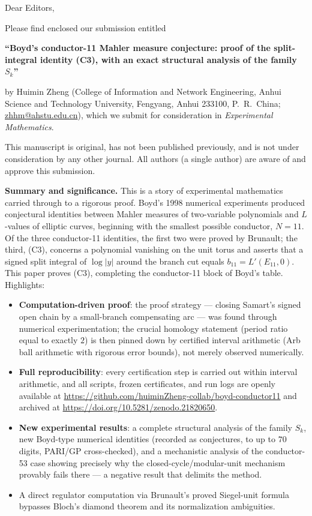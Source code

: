 \documentclass[11pt]{article}
\begin{document}
\thispagestyle{empty}

Dear Editors,

Please find enclosed our submission entitled

\begin{center}
\textbf{``Boyd's conductor-11 Mahler measure conjecture: proof of the
split-integral identity (C3), with an exact structural analysis of the
family $S_k$''}
\end{center}

by Huimin Zheng (College of Information and Network Engineering, Anhui
Science and Technology University, Fengyang, Anhui 233100, P.~R.~China;
\url{zhhm@ahstu.edu.cn}), which we submit for consideration in
\emph{Experimental Mathematics}.

This manuscript is original, has not been published previously, and is
not under consideration by any other journal. All authors (a single
author) are aware of and approve this submission.

\textbf{Summary and significance.} This is a story of experimental
mathematics carried through to a rigorous proof. Boyd's 1998 numerical
experiments produced conjectural identities between Mahler measures of
two-variable polynomials and $L$-values of elliptic curves, beginning
with the smallest possible conductor, $N=11$. Of the three
conductor-11 identities, the first two were proved by Brunault; the
third, (C3), concerns a polynomial vanishing on the unit torus and
asserts that a signed split integral of $\log|y|$ around the branch
cut equals $b_{11}=L'(E_{11},0)$. This paper proves (C3), completing
the conductor-11 block of Boyd's table. Highlights:
\begin{itemize}
\item \textbf{Computation-driven proof}: the proof strategy --- closing
Samart's signed open chain by a small-branch compensating arc --- was
found through numerical experimentation; the crucial homology
statement (period ratio equal to exactly $2$) is then pinned down by
certified interval arithmetic (Arb ball arithmetic with rigorous error
bounds), not merely observed numerically.
\item \textbf{Full reproducibility}: every certification step is carried
out within interval arithmetic, and all scripts, frozen certificates,
and run logs are openly available at
\url{https://github.com/huiminZheng-collab/boyd-conductor11} and
archived at \url{https://doi.org/10.5281/zenodo.21820650}.
\item \textbf{New experimental results}: a complete structural analysis
of the family $S_k$, new Boyd-type numerical identities (recorded as
conjectures, to up to $70$ digits, PARI/GP cross-checked), and a
mechanistic analysis of the conductor-53 case showing precisely why
the closed-cycle/modular-unit mechanism provably fails there --- a
negative result that delimits the method.
\item A direct regulator computation via Brunault's proved Siegel-unit
formula bypasses Bloch's diamond theorem and its normalization
ambiguities.
\end{itemize}
\end{document}
